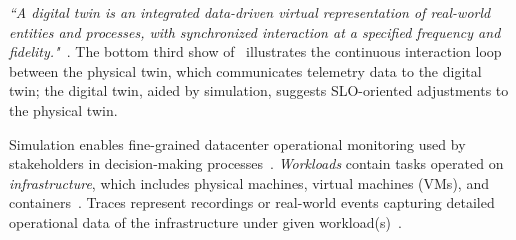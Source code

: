 \textit{``A digital twin is an integrated data-driven virtual representation of real-world entities and processes, with synchronized interaction at a specified frequency and fidelity."}~\cite{DTC_Digital_Twin_Definition_2025}. The bottom third show of~ illustrates the continuous interaction loop between the physical twin, which communicates telemetry data to the digital twin; the digital twin, aided by simulation, suggests SLO-oriented adjustments to the physical twin.

Simulation enables fine-grained datacenter operational monitoring used by stakeholders in decision-making processes~\cite{nicolae5377101m3sa}. \textit{Workloads} contain tasks operated on \textit{infrastructure}, which includes physical machines, virtual machines (VMs), and containers~\cite{nicolae5377101m3sa}. Traces represent recordings or real-world events capturing detailed operational data of the infrastructure under given workload(s)~\cite{nicolae5377101m3sa}.








